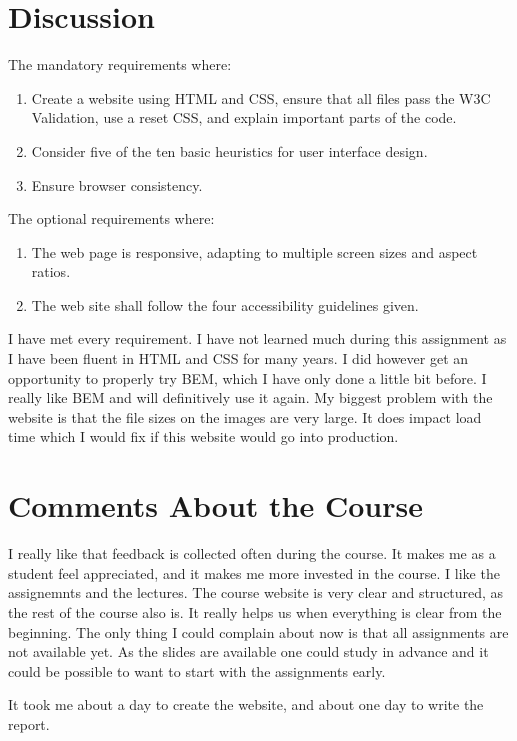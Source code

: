 \documentclass[a4paper]{scrartcl}
\begin{document}
\section{Discussion}

The mandatory requirements where:
\begin{enumerate}
	\item Create a website using HTML and CSS, ensure that all files pass the W3C Validation, use a reset CSS, and explain important parts of the code.
	\item Consider five of the ten basic heuristics for user interface design.
	\item Ensure browser consistency.
\end{enumerate}

The optional requirements where:
\begin{enumerate}
	\item The web page is responsive, adapting to multiple screen sizes and aspect ratios.
	\item The web site shall follow the four accessibility guidelines given.
\end{enumerate}


\noindent
I have met every requirement. I have not learned much during this assignment as I have been fluent in HTML and CSS for many years. I did however get an opportunity to properly try BEM, which I have only done a little bit before. I really like BEM and will definitively use it again. My biggest problem with the website is that the file sizes on the images are very large. It does impact load time which I would fix if this website would go into production.

\section{Comments About the Course}

I really like that feedback is collected often during the course. It makes me as a student feel appreciated, and it makes me more invested in the course. I like the assignemnts and the lectures. The course website is very clear and structured, as the rest of the course also is. It really helps us when everything is clear from the beginning. The only thing I could complain about now is that all assignments are not available yet. As the slides are available one could study in advance and it could be possible to want to start with the assignments early.

It took me about a day to create the website, and about one day to write the report.

\printbibliography[heading=bibintoc]
\end{document}
